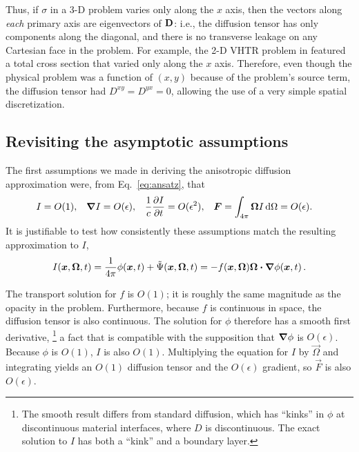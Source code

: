 Thus, if $\sigma$ in a 3-D problem varies only along
the $x$ axis, then the vectors along \emph{each} primary axis are
eigenvectors of $\mathbf{D}$: i.e., the diffusion tensor has only
components along the diagonal, and there is no transverse leakage on any
Cartesian face in the problem. For example, the 2-D VHTR problem in
\cite{Lar2009c} featured a total cross section that varied only along the $x$
axis. Therefore, even though the physical problem was a function of $(x,y)$
because of the problem's source term, the diffusion tensor had
$D^{xy}=D^{yx}=0$, allowing the use of a very simple spatial discretization.

\subsection{Revisiting the asymptotic assumptions}

The first assumptions we made in deriving the anisotropic diffusion
approximation were, from Eq.~\eqref{eq:ansatz}, that
\begin{align*}
  I &= O(1), &
  \bm{\nabla} I &= O(\epsilon), &
  \frac{1}{c}\frac{\partial I}{\partial t} &= O(\epsilon^2), &
  \bm{F} = \int_{4\pi} \bm{\Omega} I\mathop{}\!\mathrm{d}\Omega &= O(\epsilon).
\end{align*}
It is justifiable to test how consistently these assumptions match the resulting
approximation to $I$,
\begin{equation*}
I(\bm{x}, \bm{\Omega}, t)
= \frac{1}{4\pi}\phi(\bm{x}, t) + \tilde\Psi(\bm{x}, \bm{\Omega}, t)
= - f(\bm{x}, \bm{\Omega}) \bm{\Omega}\bm{\cdot} \bm{\nabla} \phi(\bm{x}, t)\,.
\end{equation*}

The transport solution for $f$ is $O(1)$; it is roughly the
same magnitude as the opacity in the problem.
Furthermore, because $f$ is continuous in space, the diffusion tensor is also
continuous. The solution for $\phi$ therefore has a smooth first
derivative,%
\footnote{
The smooth result differs from standard diffusion, which has
``kinks'' in $\phi$ at discontinuous material interfaces, where $D$ is
discontinuous. The exact solution to $I$ has both a ``kink'' and a boundary
layer.
}
a fact that is compatible with the supposition that $\bm{\nabla} \phi$
is $O(\epsilon)$. Because $\phi$ is $O(1)$, $I$ is also $O(1)$.
Multiplying the equation for $I$ by $\vec{\Omega}$ and integrating yields an
$O(1)$
diffusion tensor and the $O(\epsilon)$ gradient, so $\vec{F}$ is also
$O(\epsilon)$.


